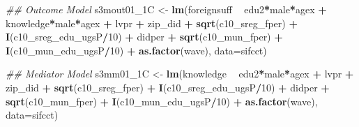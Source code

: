 \documentclass[
]{article}
\newenvironment{Shaded}{\begin{snugshade}}{\end{snugshade}}
\newcommand{\CommentTok}[1]{\textcolor[rgb]{0.56,0.35,0.01}{\textit{#1}}}
\newcommand{\DataTypeTok}[1]{\textcolor[rgb]{0.13,0.29,0.53}{#1}}
\newcommand{\DecValTok}[1]{\textcolor[rgb]{0.00,0.00,0.81}{#1}}
\newcommand{\KeywordTok}[1]{\textcolor[rgb]{0.13,0.29,0.53}{\textbf{#1}}}
\newcommand{\NormalTok}[1]{#1}
\newcommand{\OperatorTok}[1]{\textcolor[rgb]{0.81,0.36,0.00}{\textbf{#1}}}
\newcommand{\StringTok}[1]{\textcolor[rgb]{0.31,0.60,0.02}{#1}}
\begin{document}
\begin{Shaded}
\begin{Highlighting}[]
\CommentTok{## Outcome Model }
\NormalTok{s3mout01_1C <-}\StringTok{ }\KeywordTok{lm}\NormalTok{(foreignsuff  }\OperatorTok{~}\StringTok{ }\NormalTok{edu2}\OperatorTok{*}\NormalTok{male}\OperatorTok{*}\NormalTok{agex }\OperatorTok{+}\StringTok{ }\NormalTok{knowledge}\OperatorTok{*}\NormalTok{male}\OperatorTok{*}\NormalTok{agex }\OperatorTok{+}\StringTok{ }\NormalTok{lvpr }\OperatorTok{+}\StringTok{  }
\StringTok{                    }\NormalTok{zip_did }\OperatorTok{+}\StringTok{ }\KeywordTok{sqrt}\NormalTok{(c10_sreg_fper) }\OperatorTok{+}\StringTok{ }\KeywordTok{I}\NormalTok{(c10_sreg_edu_ugsP}\OperatorTok{/}\DecValTok{10}\NormalTok{) }\OperatorTok{+}\StringTok{ }
\StringTok{                    }\NormalTok{didper }\OperatorTok{+}\StringTok{ }\KeywordTok{sqrt}\NormalTok{(c10_mun_fper) }\OperatorTok{+}\StringTok{ }\KeywordTok{I}\NormalTok{(c10_mun_edu_ugsP}\OperatorTok{/}\DecValTok{10}\NormalTok{) }\OperatorTok{+}\StringTok{ }
\StringTok{                    }\KeywordTok{as.factor}\NormalTok{(wave), }\DataTypeTok{data=}\NormalTok{sifcct)}

\CommentTok{## Mediator Model}
\NormalTok{s3mm01_1C <-}\StringTok{ }\KeywordTok{lm}\NormalTok{(knowledge  }\OperatorTok{~}\StringTok{ }\NormalTok{edu2}\OperatorTok{*}\NormalTok{male}\OperatorTok{*}\NormalTok{agex }\OperatorTok{+}\StringTok{ }\NormalTok{lvpr }\OperatorTok{+}\StringTok{  }
\StringTok{                  }\NormalTok{zip_did }\OperatorTok{+}\StringTok{ }\KeywordTok{sqrt}\NormalTok{(c10_sreg_fper) }\OperatorTok{+}\StringTok{ }\KeywordTok{I}\NormalTok{(c10_sreg_edu_ugsP}\OperatorTok{/}\DecValTok{10}\NormalTok{) }\OperatorTok{+}\StringTok{ }
\StringTok{                  }\NormalTok{didper }\OperatorTok{+}\StringTok{ }\KeywordTok{sqrt}\NormalTok{(c10_mun_fper) }\OperatorTok{+}\StringTok{ }\KeywordTok{I}\NormalTok{(c10_mun_edu_ugsP}\OperatorTok{/}\DecValTok{10}\NormalTok{) }\OperatorTok{+}\StringTok{ }
\StringTok{                  }\KeywordTok{as.factor}\NormalTok{(wave), }\DataTypeTok{data=}\NormalTok{sifcct)}


\end{Highlighting}
\end{Shaded}
\end{document}
